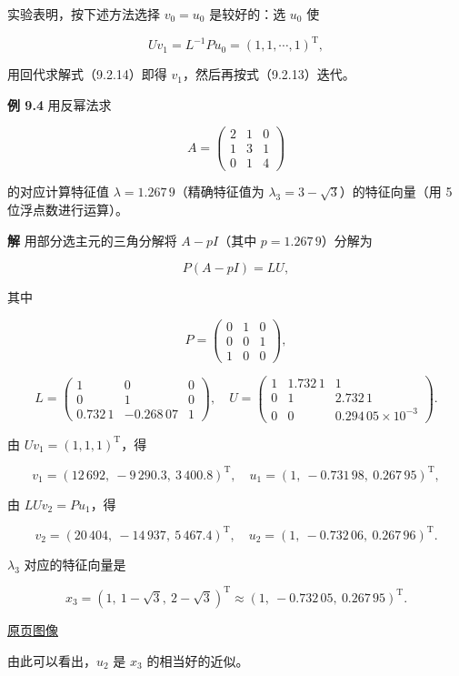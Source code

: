 \documentclass[
  10pt,
  fontset=fandol]{ctexart}
\begin{document}
实验表明，按下述方法选择 \(v_0=u_0\) 是较好的：选 \(u_0\) 使

\[
Uv_1=L^{-1}Pu_0=(1,1,\cdots,1)^{\mathrm T},
\tag{9.2.14}
\]

用回代求解式（9.2.14）即得 \(v_1\)，然后再按式（9.2.13）迭代。

\textbf{例 9.4} 用反幂法求

\[
A=\begin{pmatrix}
2&1&0\\
1&3&1\\
0&1&4
\end{pmatrix}
\]

的对应计算特征值 \(\lambda=1.267\,9\)（精确特征值为 \(\lambda_3=3-\sqrt3\)）的特征向量（用 5 位浮点数进行运算）。

\textbf{解} 用部分选主元的三角分解将 \(A-pI\)（其中 \(p=1.267\,9\)）分解为

\[
P(A-pI)=LU,
\]

其中

\[
P=\begin{pmatrix}
0&1&0\\
0&0&1\\
1&0&0
\end{pmatrix},
\]

\[
L=\begin{pmatrix}
1&0&0\\
0&1&0\\
0.732\,1&-0.268\,07&1
\end{pmatrix},\quad
U=\begin{pmatrix}
1&1.732\,1&1\\
0&1&2.732\,1\\
0&0&0.294\,05\times10^{-3}
\end{pmatrix}.
\]

由 \(Uv_1=(1,1,1)^{\mathrm T}\)，得

\[
v_1=(12\,692,\ -9\,290.3,\ 3\,400.8)^{\mathrm T},\quad
u_1=(1,\ -0.731\,98,\ 0.267\,95)^{\mathrm T},
\]

由 \(LUv_2=Pu_1\)，得

\[
v_2=(20\,404,\ -14\,937,\ 5\,467.4)^{\mathrm T},\quad
u_2=(1,\ -0.732\,06,\ 0.267\,96)^{\mathrm T}.
\]

\(\lambda_3\) 对应的特征向量是

\[
x_3=(1,\ 1-\sqrt3,\ 2-\sqrt3)^{\mathrm T}\approx(1,\ -0.732\,05,\ 0.267\,95)^{\mathrm T}.
\]

\href{../../source-images/pdf-243.jpeg}{原页图像}

由此可以看出，\(u_2\) 是 \(x_3\) 的相当好的近似。
\end{document}
